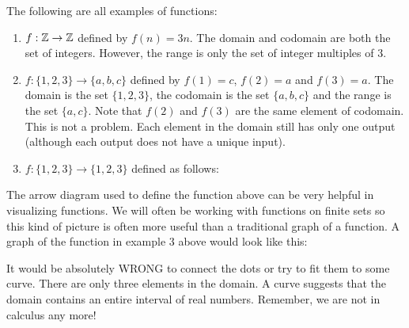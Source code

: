 \documentclass[12pt]{article}
\begin{document}
\begin{example}
  The following are all examples of functions:
  \begin{enumerate}
    \item $f:\mathbb Z \to \mathbb Z$ defined by $f(n) = 3n$.  The domain and codomain are both the set of integers.  However, the range is only the set of integer multiples of 3.
    \item $f: \{1,2,3\} \to \{a,b,c\}$ defined by $f(1) = c$, $f(2) = a$ and $f(3) = a$.  The domain is the set $\{1,2,3\}$, the codomain is the set $\{a,b,c\}$ and the range is the set $\{a,c\}$.  Note that $f(2)$ and $f(3)$ are the same element of codomain.  This is not a problem.  Each element in the domain still has only one output (although each output does not have a unique input).
    \item $f:\{1,2,3\} \to \{1,2,3\}$ defined as follows:
    \begin{center}

    \end{center}

  \end{enumerate}

\end{example}

The arrow diagram used to define the function above can be very helpful in visualizing functions.  We will often be working with functions on finite sets so this kind of picture is often more useful than a traditional graph of a function.  A graph of the function in example 3 above would look like this:

\begin{center}

\end{center}

It would be absolutely WRONG to connect the dots or try to fit them to some curve.  There are only three elements in the domain.  A curve suggests that the domain contains an entire interval of real numbers.  Remember, we are not in calculus any more!
\end{document}
